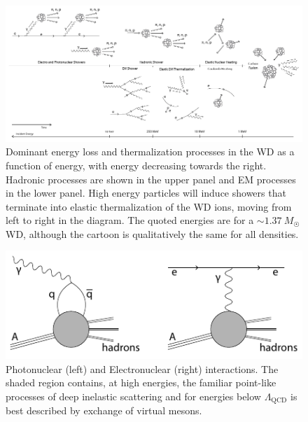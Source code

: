\documentclass[preprintnumbers,amsmath,amssymb,prd,superscriptaddress]{revtex4}
\newcommand{\x}[1]{\ensuremath{\text{#1}}} %
\begin{document}
\begin{figure}
\includegraphics[scale=1.15]{cooling-cartoon.pdf}
\caption{Dominant energy loss and thermalization processes in the WD as a function of energy, with energy decreasing towards the right.  
Hadronic processes are shown in the upper panel and EM processes in the lower panel. 
High energy particles will induce showers that terminate into elastic thermalization of the WD ions, moving from left to right in the diagram. 
The quoted energies are for a $\sim 1.37 ~M_{\astrosun}$ WD, although the cartoon is qualitatively the same for all densities.}
\label{fig:cooling-cartoon}
\end{figure}



\begin{figure}
\includegraphics[scale=1.0]{electrophotonuclear-diagram.pdf}
\caption{Photonuclear (left) and Electronuclear (right) interactions. The shaded region contains, at high energies, the familiar point-like processes of deep inelastic scattering and for energies below $\Lambda_\x{QCD}$ is best described by exchange of virtual mesons.}
\label{fig:electrophotonuclear-diagram}
\end{figure}
\end{document}
